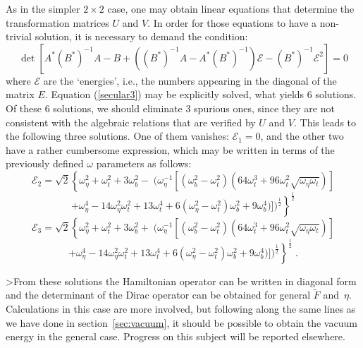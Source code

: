 \documentclass[a4paper,12pt]{article}
\newcommand{\Fd}{\widetilde{F}}
\newcommand{\n}{\eta}
\begin{document}
As in the simpler $2\times2$ case, one may obtain linear equations that determine 
the transformation matrices $U$ and $V$. In order for those equations to have 
a non-trivial solution, it is necessary to demand the condition:
\begin{equation}
  \label{secular3}
\det\left[A^* (B^*)^{-1} A - B + ( (B^*)^{-1} A - A^* (B^*)^{-1}) {\mathcal E} - (B^*)^{-1} 
{\mathcal E}^2 \right] = 0
\end{equation}
where ${\mathcal E}$ are the `energies', i.e., the numbers appearing in the
diagonal of the matrix $E$.
Equation (\ref{secular3}) may be explicitly solved, what yields $6$ solutions.
Of these $6$ solutions, we should eliminate $3$ spurious ones, since they are
not consistent with the algebraic relations that are verified by $U$ and $V$.
This leads to the following three solutions. One of them vanishes: 
${\mathcal E}_1=0$, and the other two have a rather cumbersome expression, which
may be written in terms of the previously defined $\omega$ parameters  as follows:
$$
{\mathcal E}_2 = \sqrt{2}\left\{ \omega_\eta^2 + \omega_t^2 + 3 \omega_b^2 - \; ( \omega_\eta^{-1} [(\omega_b^2-\omega_t^2)( 64 \omega_t^3 + 96 \omega_t^2 \sqrt{\omega_\eta \omega_t})]
\right.
$$
\begin{equation}
\left.
+ \omega_\eta^4 - 14 \omega_\eta^2 \omega_t^2 + 13 \omega_t^4 + 6 (\omega_\eta^2-\omega_t^2)\omega_b^2 + 9 \omega_b^4)])^{\frac{1}{2}} \right\}^{\frac{1}{2}}
\end{equation}
$$
{\mathcal E}_3 = \sqrt{2}\left\{ \omega_\eta^2 + \omega_t^2 + 3 \omega_b^2 + \; ( \omega_\eta^{-1} [(\omega_b^2-\omega_t^2)( 64 \omega_t^3 + 96 \omega_t^2 \sqrt{\omega_\eta \omega_t})]
\right.
$$
\begin{equation}
\left.
+ \omega_\eta^4 - 14 \omega_\eta^2 \omega_t^2 + 13 \omega_t^4 + 6 (\omega_\eta^2-\omega_t^2)\omega_b^2 + 9 \omega_b^4)])^{\frac{1}{2}} \right\}^{\frac{1}{2}} \;.  
\end{equation}
%

>From these solutions the Hamiltonian operator can be written in
diagonal form and the determinant of the Dirac operator can be
obtained for general $\Fd$ and~$\n$. Calculations in this case are
more involved, but following along the same lines as we have done in
section~\ref{sec:vacuum}, it should be possible to obtain the vacuum
energy in the general case. Progress on this subject will be reported
elsewhere.
\end{document}
